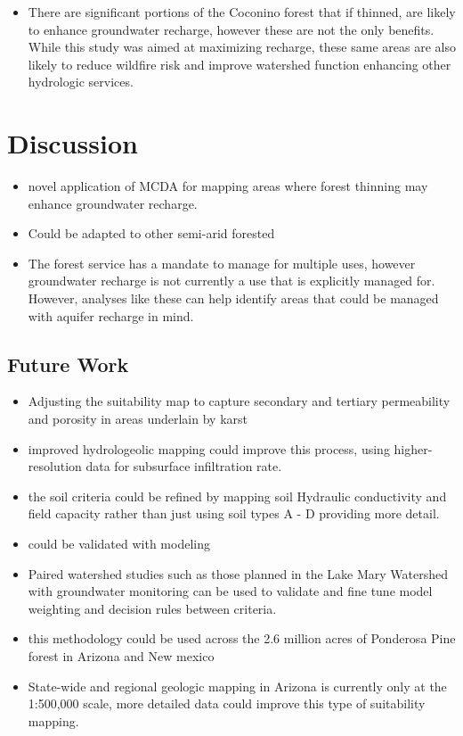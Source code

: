 \documentclass[
  number]{elsarticle}
\providecommand{\tightlist}{%
  \setlength{\itemsep}{0pt}\setlength{\parskip}{0pt}}\usepackage{longtable,booktabs,array}
\begin{document}
\begin{itemize}
\tightlist
\item
  There are significant portions of the Coconino forest that if thinned,
  are likely to enhance groundwater recharge, however these are not the
  only benefits. While this study was aimed at maximizing recharge,
  these same areas are also likely to reduce wildfire risk and improve
  watershed function enhancing other hydrologic services.
\end{itemize}

\section{Discussion}\label{discussion}

\begin{itemize}
\item
  novel application of MCDA for mapping areas where forest thinning may
  enhance groundwater recharge.
\item
  Could be adapted to other semi-arid forested
\item
  The forest service has a mandate to manage for multiple uses, however
  groundwater recharge is not currently a use that is explicitly managed
  for. However, analyses like these can help identify areas that could
  be managed with aquifer recharge in mind.
\end{itemize}

\subsection{Future Work}\label{future-work}

\begin{itemize}
\item
  Adjusting the suitability map to capture secondary and tertiary
  permeability and porosity in areas underlain by karst
\item
  improved hydrologeolic mapping could improve this process, using
  higher-resolution data for subsurface infiltration rate.
\item
  the soil criteria could be refined by mapping soil Hydraulic
  conductivity and field capacity rather than just using soil types A -
  D providing more detail.
\item
  could be validated with modeling
\item
  Paired watershed studies such as those planned in the Lake Mary
  Watershed with groundwater monitoring can be used to validate and fine
  tune model weighting and decision rules between criteria.
\item
  this methodology could be used across the 2.6 million acres of
  Ponderosa Pine forest in Arizona and New mexico
\item
  State-wide and regional geologic mapping in Arizona is currently only
  at the 1:500,000 scale, more detailed data could improve this type of
  suitability mapping.
\end{itemize}
\end{document}
